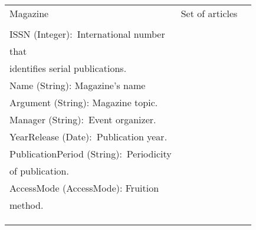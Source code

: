 \begin{longtable}{l|l|l}
Magazine & \textcolor[rgb]{0.125,0.129,0.141}{Set of articles}                                                                                                        & \begin{tabular}[c]{@{}l@{}}\\\\ISSN (Integer):~\textcolor[rgb]{0.125,0.129,0.141}{International number }\\\textcolor[rgb]{0.125,0.129,0.141}{that}\\\textcolor[rgb]{0.125,0.129,0.141}{identifies serial publications.}\\Name (String): Magazine's name\\Argument (String): Magazine topic.\\Manager (String):~\textcolor[rgb]{0.125,0.129,0.141}{Event organizer.}\\YearRelease (Date):~\textcolor[rgb]{0.125,0.129,0.141}{Publication year.}\\PublicationPeriod (String):~\textcolor[rgb]{0.125,0.129,0.141}{Periodicity}\\\textcolor[rgb]{0.125,0.129,0.141}{of publication.}\\AccessMode (AccessMode): Fruition\\method.\\\\\\\end{tabular}                                                                                                                                                                                                                                                                                                                                                                                                                                                                                                                                                                                                                                                                                \\ 
\hline

\end{longtable}
